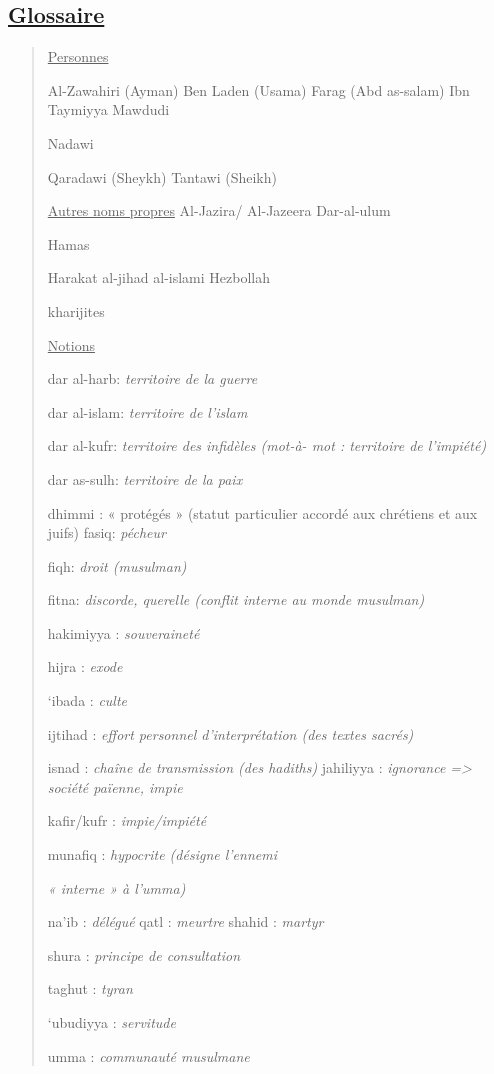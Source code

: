 \hypertarget{glossaire-4}{%
\subsection{\texorpdfstring{\underline{Glossaire}}{Glossaire}}\label{glossaire-4}}

\begin{quote}
\underline{Personnes}

Al-Zawahiri (Ayman) Ben Laden (Usama) Farag (Abd as-salam) Ibn Taymiyya
Mawdudi

Nadawi

Qaradawi (Sheykh) Tantawi (Sheikh)

\underline{Autres noms propres} Al-Jazira/ Al-Jazeera Dar-al-ulum

Hamas

Harakat al-jihad al-islami Hezbollah

kharijites

\underline{Notions}

dar al-harb: \emph{territoire de la guerre}

dar al-islam: \emph{territoire de l'islam}

dar al-kufr: \emph{territoire des infidèles (mot-à- mot : territoire de
l'impiété)}

dar as-sulh: \emph{territoire de la paix}

dhimmi : « protégés » (statut particulier accordé aux chrétiens et aux
juifs) fasiq: \emph{pécheur}

fiqh: \emph{droit (musulman)}

fitna: \emph{discorde, querelle (conflit interne au monde musulman)}

hakimiyya : \emph{souveraineté}

hijra : \emph{exode}

`ibada : \emph{culte}

ijtihad : \emph{effort personnel d'interprétation (des textes sacrés)}

isnad : \emph{chaîne de transmission (des hadiths)} jahiliyya :
\emph{ignorance =\textgreater{} société païenne, impie}

kafir/kufr : \emph{impie/impiété}

munafiq : \emph{hypocrite (désigne l'ennemi}

\emph{« interne » à l'umma)}

na'ib : \emph{délégué} qatl : \emph{meurtre} shahid : \emph{martyr}

shura : \emph{principe de consultation}

taghut : \emph{tyran}

`ubudiyya : \emph{servitude}

umma : \emph{communauté musulmane}
\end{quote}

